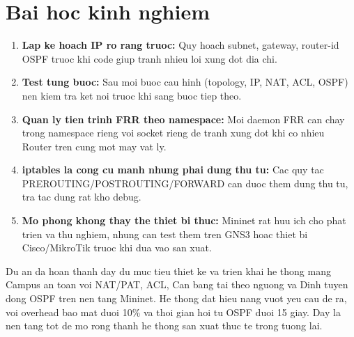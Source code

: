 \section{Bai hoc kinh nghiem}

\begin{enumerate}
    \item \textbf{Lap ke hoach IP ro rang truoc:}  Quy hoach subnet, gateway, router-id OSPF truoc khi code giup tranh nhieu loi xung dot dia chi.
    \item \textbf{Test tung buoc:} Sau moi buoc cau hinh (topology, IP, NAT, ACL, OSPF) nen kiem tra ket noi truoc khi sang buoc tiep theo.
    \item \textbf{Quan ly tien trinh FRR theo namespace:} Moi daemon FRR can chay trong namespace rieng voi socket rieng de tranh xung dot khi co nhieu Router tren cung mot may vat ly.
    \item \textbf{iptables la cong cu manh nhung phai dung thu tu:} Cac quy tac PREROUTING/POSTROUTING/FORWARD can duoc them dung thu tu, tra tac dung rat kho debug.
    \item \textbf{Mo phong khong thay the thiet bi thuc:} Mininet rat huu ich cho phat trien va thu nghiem, nhung can test them tren GNS3 hoac thiet bi Cisco/MikroTik truoc khi dua vao san xuat.
\end{enumerate}

\vspace{0.5cm}
Du an da hoan thanh day du muc tieu thiet ke va trien khai he thong mang Campus an toan voi NAT/PAT, ACL, Can bang tai theo nguong va Dinh tuyen dong OSPF tren nen tang Mininet. He thong dat hieu nang vuot yeu cau de ra, voi overhead bao mat duoi 10\% va thoi gian hoi tu OSPF duoi 15 giay. Day la nen tang tot de mo rong thanh he thong san xuat thuc te trong tuong lai.
